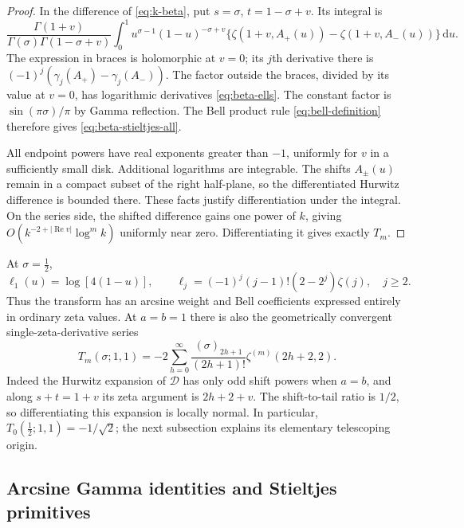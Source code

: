 \documentclass[11pt,a4paper]{article}
\numberwithin{equation}{section}
\theoremstyle{definition}
\theoremstyle{remark}
\newcommand{\dd}{\,\mathrm d}
\newcommand{\Rea}{\operatorname{Re}}
\newcommand{\Def}{\mathcal D}
\begin{document}
\begin{proof}
In the difference of \eqref{eq:k-beta}, put
$s=\sigma$, $t=1-\sigma+v$. Its integral is
\[
 \frac{\Gamma(1+v)}{\Gamma(\sigma)\Gamma(1-\sigma+v)}
 \int_0^1 u^{\sigma-1}(1-u)^{-\sigma+v}
 \{\zeta(1+v,A_+(u))-\zeta(1+v,A_-(u))\}\dd u.
\]
The expression in braces is holomorphic at $v=0$; its $j$th
derivative there is $(-1)^j(\gamma_j(A_+)-\gamma_j(A_-))$.
The factor outside the braces, divided by its value at $v=0$,
has logarithmic derivatives \eqref{eq:beta-ells}. The constant
factor is $\sin(\pi\sigma)/\pi$ by Gamma reflection.
The Bell product rule \eqref{eq:bell-definition} therefore gives
\eqref{eq:beta-stieltjes-all}.

All endpoint powers have real exponents greater than $-1$, uniformly
for $v$ in a sufficiently small disk. Additional logarithms are
integrable. The shifts $A_\pm(u)$ remain in a compact subset of the
right half-plane, so the differentiated Hurwitz difference is
bounded there. These facts justify differentiation under the
integral. On the series side, the shifted difference gains one
power of $k$, giving $O(k^{-2+\lvert\Rea v\rvert}\log^m k)$
uniformly near zero. Differentiating it gives exactly $T_m$.
\end{proof}

At $\sigma=\tfrac12$,
\begin{equation}\label{eq:half-beta-ells}
 \ell_1(u)=\log[4(1-u)],\qquad
 \ell_j=(-1)^j(j-1)!(2-2^j)\zeta(j),\quad j\ge2.
\end{equation}
Thus the transform has an arcsine weight and Bell coefficients
expressed entirely in ordinary zeta values. At $a=b=1$ there is
also the geometrically convergent single-zeta-derivative series
\begin{equation}\label{eq:beta-jet-zeta}
 T_m(\sigma;1,1)
 =-2\sum_{h=0}^{\infty}\frac{(\sigma)_{2h+1}}{(2h+1)!}
       \zeta^{(m)}(2h+2,2).
\end{equation}
Indeed the Hurwitz expansion of $\Def$ has only odd shift powers
when $a=b$, and along $s+t=1+v$ its zeta argument is $2h+2+v$.
The shift-to-tail ratio is $1/2$, so differentiating this expansion
is locally normal. In particular,
$T_0(\tfrac12;1,1)=-1/\sqrt2$; the next subsection explains its
elementary telescoping origin.

\subsection{Arcsine Gamma identities and Stieltjes primitives}
\end{document}
